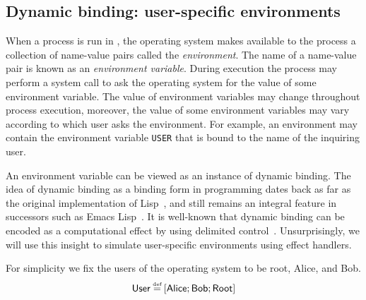 \documentclass[12pt,phd,lfcs,twoside,openright,logo,leftchapter,normalheadings]{infthesis}
\theoremstyle{plain}
\theoremstyle{definition}
\begin{document}
\subsection{Dynamic binding: user-specific environments}
\label{sec:tiny-unix-env}

When a process is run in \UNIX{}, the operating system makes available
to the process a collection of name-value pairs called the
\emph{environment}.
%
The name of a name-value pair is known as an \emph{environment
  variable}.
%
During execution the process may perform a system call to ask the
operating system for the value of some environment variable.
%
The value of environment variables may change throughout process
execution, moreover, the value of some environment variables may vary
according to which user asks the environment.
%
For example, an environment may contain the environment variable
\texttt{USER} that is bound to the name of the inquiring user.

An environment variable can be viewed as an instance of dynamic
binding. The idea of dynamic binding as a binding form in programming
dates back as far as the original implementation of
Lisp~\cite{McCarthy60}, and still remains an integral feature in
successors such as Emacs Lisp~\cite{LewisLSG20}. It is well-known that
dynamic binding can be encoded as a computational effect by using
delimited control~\cite{KiselyovSS06}.
%
Unsurprisingly, we will use this insight to simulate user-specific
environments using effect handlers.

For simplicity we fix the users of the operating system to be root,
Alice, and Bob.
%
\[
  \User \defas [\Alice;\Bob;\Root]
\]
\end{document}
